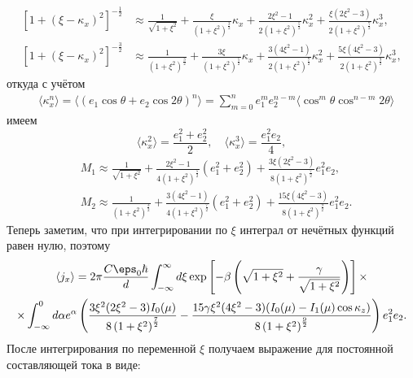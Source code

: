 \begin{align*}
    \left[1 + (\xi-\kappa_x)^2\right]^{-\frac{1}{2}} & \approx
    \frac{1}{\sqrt{1+\xi^2}} +
    \frac{\xi}{\left(1+\xi^2\right)^\frac{3}{2}}\kappa_x +
    \frac{2\xi^2-1}{2\left(1+\xi^2\right)^\frac{5}{2}}\kappa_x^2+
    \frac{\xi(2\xi^2-3)}{2\left(1+\xi^2\right)^\frac{7}{2}}\kappa_x^3,\\
    \left[1 + (\xi-\kappa_x)^2\right]^{-\frac{3}{2}} & \approx
    \frac{1}{\left(1+\xi^2\right)^\frac{3}{2}} +
    \frac{3\xi}{\left(1+\xi^2\right)^\frac{5}{2}}\kappa_x +
    \frac{3(4\xi^2-1)}{2\left(1+\xi^2\right)^\frac{7}{2}}\kappa_x^2+
    \frac{5\xi(4\xi^2-3)}{2\left(1+\xi^2\right)^\frac{9}{2}}\kappa_x^3,
\end{align*}
откуда с учётом
\begin{align*}
    & \langle\kappa_x^n\rangle = \langle(e_1\cos\theta+e_2\cos2\theta)^n\rangle=
    \sum_{m=0}^n e_1^m e_2^{n-m} \langle  \cos^m\theta
    \cos^{n-m}2\theta\rangle
\end{align*}
имеем
\begin{equation*}
    \langle \kappa_x^2 \rangle = \frac{e_1^2 + e_2^2}{2},\quad
    \langle \kappa_x^3 \rangle = \frac{e_1^2e_2}{4},
\end{equation*}
\begin{align}
    & M_1 \approx
    \frac{1}{\sqrt{1+\xi^2}} +
    \frac{2\xi^2-1}{4\left(1+\xi^2\right)^\frac{5}{2}}(e_1^2 + e_2^2) +
    \frac{3\xi(2\xi^2-3)}{8\left(1+\xi^2\right)^\frac{7}{2}}e_1^2e_2,\label{eq:M1} \\
    & M_2 \approx
    \frac{1}{\left(1+\xi^2\right)^\frac{3}{2}} +
    \frac{3(4\xi^2-1)}{4\left(1+\xi^2\right)^\frac{7}{2}}(e_1^2 + e_2^2)+
    \frac{15\xi(4\xi^2-3)}{8\left(1+\xi^2\right)^\frac{9}{2}}e_1^2e_2.\label{eq:M2}
\end{align}
Теперь заметим, что при интегрировании по \( \xi \) интеграл от нечётных функций равен нулю, поэтому
\begin{gather*}
    \langle j_x \rangle = 2\pi \frac{C\eps_0\hbar}{d} \int_{-\infty}^\infty d\xi
    \exp\left[-\beta\left(\sqrt{1+\xi^2}+
    \frac{\gamma}{\sqrt{1+\xi^2}}\right)\right] \times \\ \times \int_{-\infty}^{0}
    d \alpha e^\alpha \left( \frac{3\xi^2(2\xi^2-3)I_0(\mu)}
    {8\left(1 + \xi^2\right)^\frac{7}{2}} -
    \frac{15\gamma\xi^2(4\xi^2-3)(I_0(\mu)-I_1(\mu)\cos\kappa_z)}
    {8\left(1 + \xi^2\right)^\frac{9}{2}}\right)e_1^2e_2.
\end{gather*}
После интегрирования по переменной \( \xi \) получаем выражение для постоянной составляющей тока в виде:
